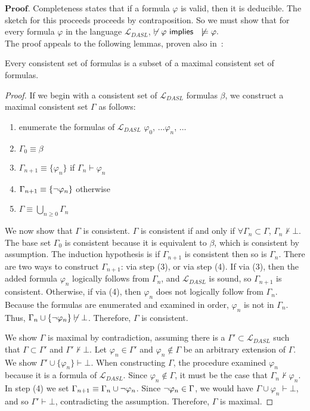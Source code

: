 $\mathbf{Proof}.$ Completeness states that if a formula $\varphi$ is valid, then it is deducible. The sketch for this proceeds proceeds by contraposition. So we must show that for every formula $\varphi$ in the language $\mathcal{L}_{DASL}$, $\not\vdash\varphi \textsf{\ implies \ } \not\models\varphi.$\\
The proof appeals to the following lemmas, proven also in~\cite{DEL,negri}:
\begin{lemma}[Lindenbaum]
Every consistent set of formulas is a subset of a maximal consistent set of formulas.
\end{lemma}
\begin{proof}
	
If we begin with a consistent set of $\mathcal{L}_{DASL}$ formulas $\beta$, we construct a maximal consistent set $\Gamma$ as follows:
\begin{enumerate}
	\item enumerate the formulas of $\mathcal{L}_{DASL}$ $\varphi_0$, $\dots \varphi_n$, $\dots$
	\item $\Gamma_0 \equiv \beta$
	\item $\Gamma_{n+1} \equiv \{\varphi_n\}$ if $\Gamma_{n} \vdash \varphi_n$ 
	\item $\Gamma_{n+1} \equiv \{{\neg} \varphi_n\}$ otherwise
	\item $\Gamma \equiv \bigcup_{n\geq0}\Gamma_n$
\end{enumerate}

We now show that $\Gamma$ is consistent. $\Gamma$ is consistent if and only if $\forall \Gamma_n \subset \Gamma$, $\Gamma_n \not\vdash \bot$. The base set $\Gamma_0$ is consistent because it is equivalent to $\beta$, which is consistent by assumption. The induction hypothesis is if $\Gamma_{n+1}$ is consistent then so is $\Gamma_{n}$. There are two ways to construct $\Gamma_{n+1}$: via step (3), or via step (4). If via (3), then the added formula $\varphi_n$ logically follows from $\Gamma_n$, and $\mathcal{L}_{DASL}$ is sound, so $\Gamma_{n+1}$ is consistent. Otherwise, if via (4), then $\varphi_n$ does not logically follow from $\Gamma_n$. Because the formulas are enumerated and examined in order, $\varphi_n$ is not in $\Gamma_n$. Thus, $\Gamma_n \cup \{{\neg}\varphi_n\} \not\vdash \bot$. Therefore, $\Gamma$ is consistent.

We show $\Gamma$ is maximal by contradiction, assuming there is a $\Gamma' \subset \mathcal{L}_{DASL}$ such that $\Gamma \subset \Gamma'$ and $\Gamma'\not\vdash\bot$. Let $\varphi_n\in\Gamma'$ and $\varphi_n\not\in\Gamma$ be an arbitrary extension of $\Gamma$. We show $\Gamma' \cup \{\varphi_n\} \vdash \bot$. When constructing $\Gamma$, the procedure examined $\varphi_n$ because it is a formula of $\mathcal{L}_{DASL}$. Since $\varphi_n\not\in\Gamma$, it must be the case that $\Gamma_n\not\vdash\varphi_n$. In step (4) we set $\Gamma_{n+1}\equiv\Gamma_n\cup{\neg}\varphi_n$. Since ${\neg}\varphi_n \in \Gamma$, we would have $\Gamma\cup\varphi_n\vdash\bot$, and so $\Gamma'\vdash\bot$, contradicting the assumption. Therefore, $\Gamma$ is maximal.  
\end{proof}

